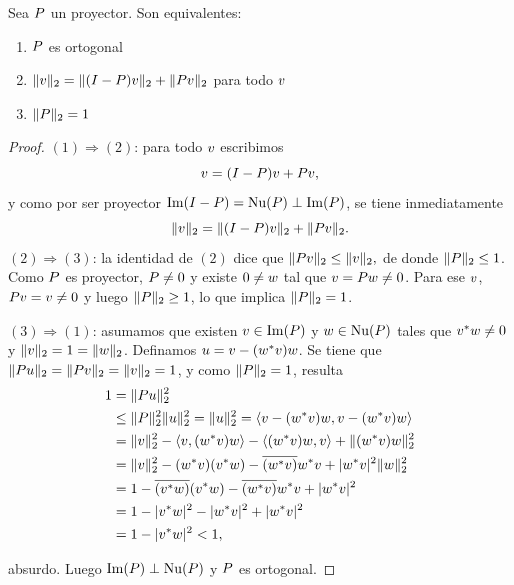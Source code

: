 \tcc
\begin{teorema}
 Sea $\Pb$ un proyector. Son equivalentes:
 \begin{enumerate}
  \item $\Pb$ es ortogonal
  \item $\|\vb\|_2=\|(\Ib-\Pb)\vb\|_2+\|\Pb\vb\|_2$ para todo $\vb$
  \item $\|\Pb\|_2=1$
 \end{enumerate}
\end{teorema}
\etcc
\begin{proof}
 $(1)\Rightarrow (2)$: para todo $\vb$ escribimos
 $$
 \vb=(\Ib-\Pb)\vb+\Pb\vb,
 $$
 y como por ser proyector $\Im(\Ib-\Pb)=\Nu(\Pb)\perp \Im(\Pb)$, se tiene inmediatamente
 $$\|\vb\|_2=\|(\Ib-\Pb)\vb\|_2+\|\Pb\vb\|_2.$$
$(2)\Rightarrow (3)$:
la identidad de $(2)$ dice que
$\|\Pb \vb\|_2\le \| \vb\|_2,$ de donde
$\|\Pb\|_2\le 1$. Como $\Pb$ es proyector,
$\Pb\neq \cero$ y existe $\cero\neq\wb$ tal que $\vb=\Pb\wb\neq\cero$. Para ese $\vb$, $\Pb\vb=\vb\neq\cero$ y luego $\|\Pb\|_2\ge 1$, lo que implica $\|\Pb\|_2= 1$.

\noindent $(3)\Rightarrow (1)$: asumamos que existen $\vb\in \Im(\Pb)$ y
$\wb\in \Nu(\Pb)$ tales que $\vb^*\wb\neq 0$ y $\|\vb\|_2=1=\|\wb\|_2$. 
Definamos $\ub=\vb-(\wb^*\vb)\wb$. Se tiene que $\|\Pb\ub\|_2=\|\Pb\vb\|_2=\|\vb\|_2=1$, y como $\|\Pb\|_2=1$, resulta
\begin{align*}
1 &=\|\Pb\ub\|_2^2 \\
&\le \|\Pb\|_2^2 \|\ub\|_2^2 = \|\ub\|_2^2  = \langle \vb-(\wb^*\vb)\wb, \vb-(\wb^*\vb)\wb \rangle \\
&= \|\vb\|_2^2- \langle \vb,  (\wb^*\vb)\wb \rangle - \langle (\wb^*\vb)\wb,   \vb\rangle + \|(\wb^*\vb)\wb\|_2^2 \\
&= \|\vb\|_2^2- (\wb^*\vb)(\vb^*\wb)-\overline{(\wb^*\vb)}\wb^*\vb+|\wb^*\vb|^2\|\wb\|_2^2 \\
&= 1-\overline{(\vb^*\wb)}(\vb^*\wb)-\overline{(\wb^*\vb)}\wb^*\vb+|\wb^*\vb|^2 \\
&=1-|\vb^*\wb|^2-|\wb^*\vb|^2 + |\wb^*\vb|^2 \\
&=1-|\vb^*\wb|^2 <1,
\end{align*}

absurdo. Luego $\Im(\Pb)\perp \Nu(\Pb)$ y $\Pb$ es ortogonal.
 \end{proof}

